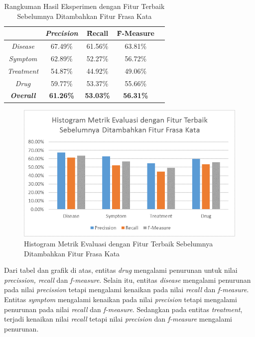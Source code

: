 	\begin{table}
		\centering
		\caption{Rangkuman Hasil Eksperimen dengan Fitur Terbaik Sebelumnya Ditambahkan Fitur Frasa Kata}
		\begin{tabular}{|c|c|c|c|c|}
			\hline
			                      & \textit{Precision} & \f{\f{Recall}} & \f{\f{F-Measure}} \\ \hline
			\textit{Disease}      & 67.49\%             & 61.56\%        & 63.81\%           \\ \hline
			\textit{Symptom}      & 62.89\%             & 52.27\%        & 56.72\%           \\ \hline
			\textit{Treatment}    & 54.87\%             & 44.92\%        & 49.06\%           \\ \hline
			\textit{Drug}		  & 59.77\%             & 53.37\%        & 55.66\%           \\ \hline
			\textit{\textbf{Overall}}&\textbf{61.26\%}  & \textbf{53.03\%}& \textbf{56.31\%} \\ \hline
		\end{tabular}
		\label{table:owndict5}
	\end{table}

	\begin{figure}
		\centering
		\includegraphics[width=0.85\linewidth]{images/histogram5}
		\caption{Histogram Metrik Evaluasi dengan Fitur Terbaik Sebelumnya Ditambahkan Fitur Frasa Kata}
		\label{fig:owndict5}
	\end{figure}

	Dari tabel dan grafik di atas, entitas \textit{drug} mengalami penurunan untuk nilai \textit{precission, recall} dan \textit{f-measure}. Selain itu, entitas \textit{disease} mengalami penurunan pada nilai \textit{precission} tetapi mengalami kenaikan pada nilai \textit{recall} dan \textit{f-measure}. Entitas \textit{symptom} mengalami kenaikan pada nilai \textit{precision} tetapi mengalami penurunan pada nilai \textit{recall} dan \textit{f-measure}. Sedangkan pada entitas \textit{treatment}, terjadi kenaikan nilai \textit{recall} tetapi nilai \textit{precision} dan \textit{f-measure} mengalami penurunan. 
	
